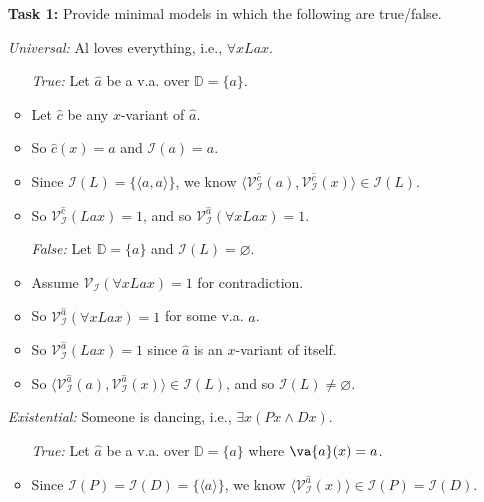 \documentclass[a4paper, 11pt]{article} %
\newcommand{\tuple}[1]{\langle#1\rangle} %
\newcommand{\set}[1]{\lbrace#1\rbrace} %
\newcommand{\I}{\mathcal{I}}
\newcommand{\D}{\mathbb{D}}
\newcommand{\VV}[2]{\mathcal{V}_{#1}^{#2}} %
\begin{document}
\begin{enumerate}
  \item[\bf Task 1:] Provide minimal models in which the following are true/false.
  \item[\it Universal:] Al loves everything, i.e., $\forall xLax$.
    \begin{itemize}
      \item[\it True:] Let $\hat{a}$ be a v.a. over $\D=\set{a}$.
      \item Let $\hat{c}$ be any $x$-variant of $\hat{a}$.
      \item So $\hat{c}(x)=a$ and $\I(a)=a$.
      \item Since $\I(L)=\set{\tuple{a,a}}$, we know $\tuple{\VV{\I}{\hat{c}}(a),\VV{\I}{\hat{c}}(x)}\in\I(L)$.
      \item So $\VV{\I}{\hat{c}}(Lax)=1$, and so $\VV{\I}{\hat{a}}(\forall xLax)=1$.
      \item[\it False:] Let $\D=\set{a}$ and $\I(L)=\varnothing$.
      \item Assume $\VV{\I}{}(\forall xLax)=1$ for contradiction. 
      \item So $\VV{\I}{\hat{a}}(\forall xLax)=1$ for some v.a. $\hat{a}$.
      \item So $\VV{\I}{\hat{a}}(Lax)=1$ since $\hat{a}$ is an $x$-variant of itself.
      \item So $\tuple{\VV{\I}{\hat{a}}(a),\VV{\I}{\hat{a}}(x)}\in\I(L)$, and so $\I(L)\neq\varnothing$.
    \end{itemize}
  \item[\it Existential:] Someone is dancing, i.e., $\exists x(Px \wedge Dx)$.
    \begin{itemize}
      \item[\it True:] Let $\hat{a}$ be a v.a. over $\D=\set{a}$ where $\va{a}(x)=a$.
      \item Since $\I(P)=\I(D)=\set{\tuple{a}}$, we know $\tuple{\VV{\I}{\hat{a}}(x)}\in\I(P)=\I(D)$.

\end{itemize}
\end{enumerate}
\end{document}
